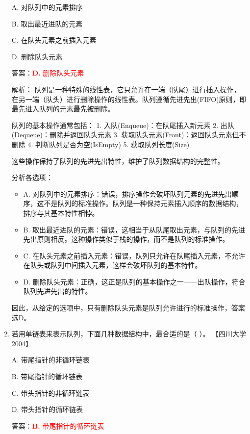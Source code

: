 \documentclass[lang=cn,newtx,10pt,scheme=chinese]{../../../elegantbook}
\begin{document}
\begin{enumerate}
    A. 对队列中的元素排序  

    B. 取出最近进队的元素  

    C. 在队头元素之前插入元素  

    D. 删除队头元素  

    答案：\textcolor{red}{\textbf{D.} 删除队头元素}

    解析：
    队列是一种特殊的线性表，它只允许在一端（队尾）进行插入操作，在另一端（队头）进行删除操作的线性表。队列遵循先进先出(FIFO)原则，即最先进入队列的元素最先被删除。

    队列的基本操作通常包括：
    1. 入队(Enqueue)：在队尾插入新元素
    2. 出队(Dequeue)：删除并返回队头元素
    3. 获取队头元素(Front)：返回队头元素但不删除
    4. 判断队列是否为空(IsEmpty)
    5. 获取队列长度(Size)

    这些操作保持了队列的先进先出特性，维护了队列数据结构的完整性。

    分析各选项：
    \begin{itemize}
        \item A. 对队列中的元素排序：错误，排序操作会破坏队列元素的先进先出顺序，这不是队列的标准操作。队列是一种保持元素插入顺序的数据结构，排序与其基本特性相悖。
        
        \item B. 取出最近进队的元素：错误，这相当于从队尾取出元素，与队列的先进先出原则相反。这种操作类似于栈的操作，而不是队列的标准操作。
        
        \item C. 在队头元素之前插入元素：错误，队列只允许在队尾插入元素，不允许在队头或队列中间插入元素，这样会破坏队列的基本特性。
        
        \item D. 删除队头元素：正确，这正是队列的基本操作之一——出队操作，符合队列先进先出的特性。
    \end{itemize}

    因此，从给定的选项中，只有删除队头元素是队列允许进行的标准操作，答案选D。

    \item 若用单链表来表示队列，下面几种数据结构中，最合适的是（ ）。  
    【四川大学 2004】  

    A. 带尾指针的非循环链表  

    B. 带尾指针的循环链表  

    C. 带头指针的非循环链表  

    D. 带头指针的循环链表  

    答案：\textcolor{red}{\textbf{B.} 带尾指针的循环链表}


\end{enumerate}
\end{document}
